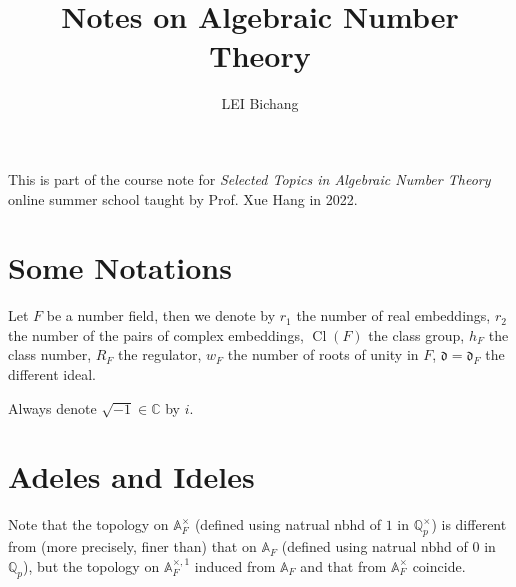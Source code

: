 \documentclass{article}
\title{Notes on Algebraic Number Theory}
\author{LEI Bichang}
\date{}
\theoremstyle{definition}
\theoremstyle{remark}
\newcommand{\C}{\mathbb{C}}
\newcommand{\Q}{\mathbb{Q}}
\newcommand{\adele}[1]{\mathbb{A}_{#1}}
\newcommand{\idele}[1]{\mathbb{A}_{#1}^{\times}}
\newcommand{\ideone}[1]{\mathbb{A}_{#1}^{\times, 1}}
\newcommand{\diff}{\mathfrak{d}}
\DeclareMathOperator{\cl}{Cl}
\begin{document}
\maketitle

This is part of the course note for \textit{Selected Topics in Algebraic Number Theory} online summer school taught by Prof. Xue Hang in 2022.

\section*{Some Notations}
\indent
Let $F$ be a number field, then we denote by $r_1$ the number of real embeddings, $r_2$ the number of the pairs of complex embeddings, $\cl(F)$ the class group, $h_F$ the class number, $R_F$ the regulator, $w_F$ the number of roots of unity in $F$, $\diff = \diff_F$ the different ideal.

Always denote $\sqrt{-1}\in \C$ by $i$.

\section{Adeles and Ideles}
Note that the topology on $\idele{F}$ (defined using natrual nbhd of $1$ in $\Q_p^\times$) is different from (more precisely, finer than) that on $\adele{F}$ (defined using natrual nbhd of $0$ in $\Q_p$),
but the topology on $\ideone{F}$ induced from $\adele{F}$ and that from $\idele{F}$ coincide.
\end{document}
